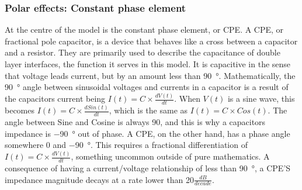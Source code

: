     \subsubsection{Polar effects: Constant phase element}
      At the centre of the model is the constant phase element, or CPE.
      A CPE, or fractional pole capacitor, is a device that behaves like a cross between a capacitor and a resistor.
      They are primarily used to describe the capacitance of double layer interfaces, the function it serves in this model.
      It is capacitive in the sense that voltage leads current, but by an amount less than \SI{90}{\degree}.
      Mathematically, the \SI{90}{\degree} angle between sinusoidal voltages and currents in a capacitor is a result of the capacitors current being $I(t) = C \times \frac{dV(t)}{dt}$.
      When $V(t)$ is a sine wave, this becomes $I(t) = C \times \frac{d Sin(t)}{dt}$, which is the same as $I(t) = C \times Cos(t)$.
      The angle between Sine and Cosine is always 90, and this is why a capacitors impedance is \SI{-90}{\degree} out of phase.
      A CPE, on the other hand, has a phase angle somewhere  0 and \SI{-90}{\degree}.
      This requires a fractional differentiation of $I(t) = C \times \frac{dV(t)}{dt}$, something uncommon outside of pure mathematics.
      A consequence of having a current/voltage relationship of less than \SI{90}{\degree}, a CPE'S impedance magnitude decays at a rate lower than 20$\frac{dB}{decade}$.

